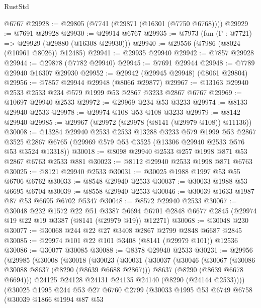 \begin{lexlean}{RustStd}
\begin{coremodule}
    @6767
@29928 := @29805 (@7741 (@29871 (@16301 (@7750 @6768))))
@29929 := @7691 @29928
@29930 := @29914 @6767
@29935 := @7973 (fun (Γ : @7721) => @29929 (@29880 (@16308 @29930)))
@29940 := @29556 (@7986 (@8024 (@10961 @8026)) @12485)
@29941 := @29935 @29940
@29942 := @7857 @29928
@29944 := @29878 (@7782 @29940)
@29945 := @7691 @29944
@29948 := @7789 @29940 @16307 @29930
@29952 := @29942 (@29945 @29948) (@8061 @29804)
@29956 := @7857 @29944 @29948 (@8066 @29877)
@29967 := @13163 @29940 @2533 @2533 @234 @579 @1999 @53 @2867 @3233 @2867 @6767
@29969 := @10697 @29940 @2533
@29972 := @29969 @234 @53 @3233
@29974 := @8133 @29940 @2533
@29978 := @29974 @108 @53 @108 @3233
@29979 := @8142 @29940
@29985 := @29967 (@29972 (@29978 (@8141 (@29979 @108)) @11136))
@30008 := @13284
    @29940
    @2533
    @2533
    @13288
    @3233
    @579
    @1999
    @53
    @2867
    @3525
    @2867
    @6765
    (@29969 @579 @53 @3525 (@13306 @29940 @2533 @576 @53 @3524 @13318))
@30018 := @8098 @29940 @2533 @257 @1998 @871 @53 @2867 @6763 @2533 @881
@30023 := @8112 @29940 @2533 @1998 @871 @6763
@30025 := @8121 @29940 @2533
@30031 := @30025 @1988 @1997 @53 @55 @6706 @6762
@30033 := @8548 @29940 @2533
@30037 := @30033 @1988 @53 @6695 @6704
@30039 := @8558 @29940 @2533
@30046 := @30039 @1633 @1987 @87 @53 @6695 @6702 @5347
@30048 := @8572 @29940 @2533
@30067 := @30048
    @232
    @1572
    @22
    @51
    @3387
    @6694
    @6701
    @2848
    @6677
    @2845
    (@29974 @19 @22 @19 @3387 (@8141 (@29979 @19)) @12271)
@30068 := @30048 @230
@30077 := @30068 @244 @22 @27 @3408 @2867 @2799 @2848 @6687 @2845
@30085 := @29974 @101 @22 @101 @3408 (@8141 (@29979 @101)) @12536
@30086 := @30077 @30085
@30088 := @8378 @29940 @2533
@30231 := @29956
    (@29985
      (@30008
        (@30018
          (@30023
            (@30031
              (@30037
                (@30046
                  (@30067
                    (@30086 @30088 @8637 (@8290 (@8639 @6688 @2867)))
                    @8637
                    (@8290 (@8639 @6678 @6694)))
                  @24125
                  @24128
                  @24131
                  @24135
                  @24140
                  (@8290 (@24144 @2533))))
              (@30025
                @1995
                @244
                @53
                @27
                @6760
                @2799
                (@30033
                  @1995
                  @53
                  @6749
                  @6758
                  (@30039
                    @1866
                    @1994
                    @87
                    @53

\end{coremodule}
\end{lexlean}
